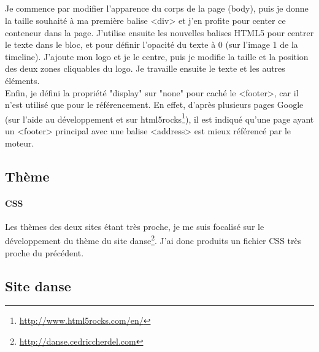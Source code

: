 \documentclass[11pt,a4paper,twoside]{report}
\begin{document}
				\subparagraph*{}Je commence par modifier l'apparence du corps de la page (body), puis je donne la taille souhaité à ma première balise <div> et j'en profite pour center ce conteneur dans la page. J'utilise ensuite les nouvelles balises HTML5 pour centrer le texte dans le bloc, et pour définir l'opacité du texte à 0 (sur l'image 1 de la timeline). J'ajoute mon logo et je le centre, puis je modifie la taille et la position des deux zones cliquables du logo. Je travaille ensuite le texte et les autres éléments.\\
				Enfin, je défini la propriété "display" sur "none" pour caché le <footer>, car il n'est utilisé que pour le référencement. En effet, d'après plusieurs pages Google (sur l'aide au développement et sur html5rocks\footnote{\url{http://www.html5rocks.com/en/}}), il est indiqué qu'une page ayant un <footer> principal avec une balise <address> est mieux référencé par le moteur.
				\newpage

		\subsection{Thème}
			\paragraph{CSS}Les thèmes des deux sites étant très proche, je me suis focalisé sur le développement du thème du site danse\footnote{\url{http://danse.cedriccherdel.com}}. J'ai donc produits un fichier CSS très proche du précédent.

		\subsection{Site danse}
\end{document}
